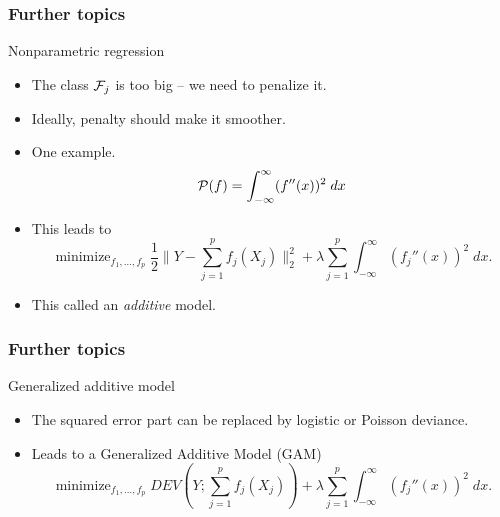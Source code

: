 \documentclass[handout]{beamer}
\newcommand{\minimize}{\mathop{\mathrm{minimize}}}
\begin{document}

   \begin{frame} \frametitle{Further topics}

   \begin{block}
   {Nonparametric regression}
       \begin{itemize}
       \item The class ${\cal F}_j$ is too big -- we need
       to penalize it.
       \item Ideally, penalty should make it smoother.
       \item One example.
       $$
       {\cal P}(f) = \int_{-\infty}^{\infty} (f''(x))^2 \; dx
       $$
       \item This leads to
       $$
       \minimize_{f_1, \dots, f_p} \frac{1}{2} \|Y-\sum_{j=1}^p f_j(X_j)\|^2_2 +
       \lambda \sum_{j=1}^p \int_{-\infty}^{\infty} (f_j''(x))^2 \; dx.
       $$
       \item This called an {\em additive} model.
       \end{itemize}
   \end{block}
   \end{frame}


   \begin{frame} \frametitle{Further topics}

   \begin{block}
   {Generalized additive model}
       \begin{itemize}
       \item The squared error part can be replaced
       by logistic or Poisson deviance.
       \item Leads to a Generalized Additive Model (GAM)
       $$
       \minimize_{f_1, \dots, f_p} DEV(Y;\sum_{j=1}^p f_j(X_j)) +
       \lambda \sum_{j=1}^p \int_{-\infty}^{\infty} (f_j''(x))^2 \; dx.
       $$
       \end{itemize}
   \end{block}
   \end{frame}

\end{document}
